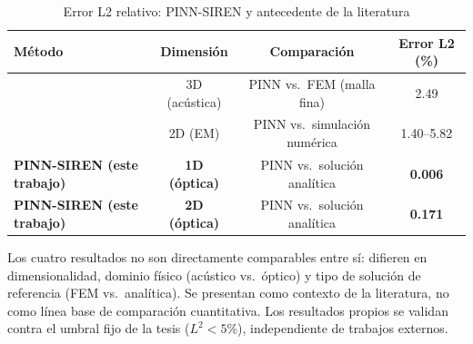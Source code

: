 \begin{table}[htbp]
\centering
\begin{threeparttable}
\caption{Error L2 relativo: PINN-SIREN y antecedente de la literatura}
\label{tab:comparativa}
\begin{tabular}{lccc}
\toprule
Método & Dimensión & Comparación & Error L2 (\%) \\
\midrule
\citet{Schoder2024_PINN_acoustics} & 3D (acústica) & PINN vs.\ FEM (malla fina) & 2.49 \\
\citet{Zhang2025_FEPIRBN} & 2D (EM) & PINN vs.\ simulación numérica & 1.40--5.82 \\
\textbf{PINN-SIREN (este trabajo)} & \textbf{1D (óptica)} & PINN vs.\ solución analítica & \textbf{0.006} \\
\textbf{PINN-SIREN (este trabajo)} & \textbf{2D (óptica)} & PINN vs.\ solución analítica & \textbf{0.171} \\
\bottomrule
\end{tabular}
\begin{tablenotes}
\small
\item Los cuatro resultados no son directamente comparables entre sí: difieren en
      dimensionalidad, dominio físico (acústico vs.\ óptico) y tipo de solución
      de referencia (FEM vs.\ analítica). Se presentan como contexto de la
      literatura, no como línea base de comparación cuantitativa. Los resultados
      propios se validan contra el umbral fijo de la tesis ($L^2 < 5\%$),
      independiente de trabajos externos.
\end{tablenotes}
\end{threeparttable}
\end{table}
